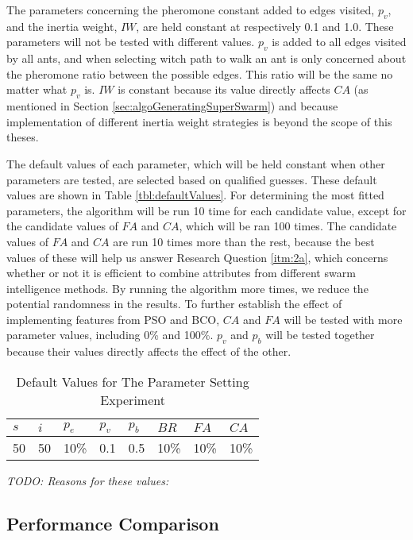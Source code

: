 The parameters concerning the pheromone constant added to edges visited, $p_v$, and the inertia weight, $IW$, are held constant at respectively 0.1 and 1.0. These parameters will not be tested with different values. $p_v$ is added to all edges visited by all ants, and when selecting witch path to walk an ant is only concerned about the pheromone ratio between the possible edges. This ratio will be the same no matter what $p_v$ is. $IW$ is constant because its value directly affects $CA$ (as mentioned in Section \vref{sec:algoGeneratingSuperSwarm}) and because implementation of different inertia weight strategies is beyond the scope of this theses. 

The default values of each parameter, which will be held constant when other parameters are tested, are selected based on qualified guesses. These default values are shown in Table \vref{tbl:defaultValues}. For determining the most fitted parameters, the algorithm will be run 10 time for each candidate value, except for the candidate values of $FA$ and $CA$, which will be ran 100 times. The candidate values of $FA$ and $CA$ are run 10 times more than the rest, because the best values of these will help us answer Research Question \vref{itm:2a}, which concerns whether or not it is efficient to combine attributes from different swarm intelligence methods. By running the algorithm more times, we reduce the potential randomness in the results. To further establish the effect of implementing features from PSO and BCO, $CA$ and $FA$ will be tested with more parameter values, including 0\% and 100\%. $p_{v}$ and $p_{b}$ will be tested together because their values directly affects the effect of the other. 

\begin{table}[H]
\label{tbl:defaultValues}
	\centering
    \begin{tabular}{|l|l|l|l|l|l|l|l|}
 	\hline
 	$s$ & $i$ & $p_{e}$ & $p_{v}$ & $p_{b}$ & $BR$  & $FA$ & $CA$  \\
 	\hline
    50 & 50 & 10\% & 0.1 & 0.5 & 10\% & 10\%  & 10\%  \\
	\hline
    \end{tabular}
    \caption {Default Values for The Parameter Setting Experiment} \emph{\color{blue} TODO: Reasons for these values:}
    \label{table:parameter_startvalues}
	\end{table}

\subsection{Performance Comparison}

